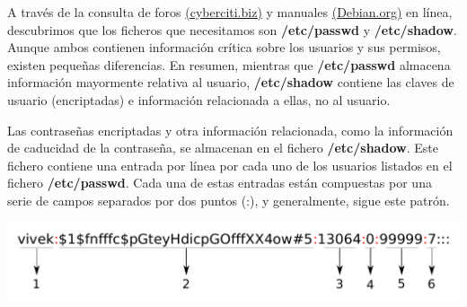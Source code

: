 A través de la consulta de foros
 \href{https://www.cyberciti.biz/faq/where-are-the-passwords-of-the-users-located-in-linux/}{(cyberciti.biz)} y manuales \href{https://www.debian.org/doc/manuals/system-administrator/ch-sysadmin-users.html}{(Debian.org)} en línea, descubrimos que los ficheros que necesitamos son \textbf{/etc/passwd} y \textbf{/etc/shadow}. Aunque ambos contienen información crítica sobre los usuarios y sus permisos, existen pequeñas diferencias. En resumen, mientras que \textbf{/etc/passwd} almacena información mayormente relativa al usuario, \textbf{/etc/shadow} contiene las claves de usuario (encriptadas) e información relacionada a ellas, no al usuario.


Las contraseñas encriptadas y otra información relacionada, como la información de caducidad de la contraseña, se almacenan en el fichero \textbf{/etc/shadow}. Este fichero contiene una entrada por línea por cada uno de los usuarios listados en el fichero \textbf{/etc/passwd}. Cada una de estas entradas están compuestas por una serie de campos separados por dos puntos (:), y generalmente, sigue este patrón.

\begin{center}
    \includegraphics[scale=0.5]{figuras/shadow.pdf}
    \label{fig:shadow}
\end{center}

